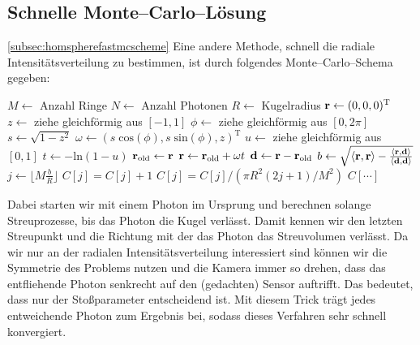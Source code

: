 	\subsection{Schnelle Monte--Carlo--Lösung}\ref{subsec:homspherefastmcscheme}
	Eine andere Methode, schnell die radiale Intensitätsverteilung zu bestimmen, ist durch folgendes Monte--Carlo--Schema gegeben:
	\begin{algorithmic}
		\STATE $M\leftarrow$ Anzahl Ringe
		\STATE $N\leftarrow$ Anzahl Photonen
		\STATE $R\leftarrow$ Kugelradius
			\STATE $\mathbf{r}\leftarrow (0,0,0)^\text{T}$
			\REPEAT
				\STATE{}
				\STATE $z\leftarrow$ ziehe gleichförmig aus $[-1,1]$
				\STATE $\phi\leftarrow$ ziehe gleichförmig aus $[0,2\pi]$
				\STATE $s\leftarrow\sqrt{1-z^2}$
				\STATE $\omega\leftarrow (s\;\text{cos}(\phi),s\;\text{sin}(\phi),z)^\text{T}$
				\STATE{}
				\STATE $u\leftarrow$ ziehe gleichförmig aus $[0,1]$
				\STATE $t\leftarrow -\text{ln}(1-u)$
				\STATE $\mathbf{r}_\text{old}\leftarrow\mathbf{r}$
				\STATE $\mathbf{r}\leftarrow\mathbf{r}_\text{old}+\omega t$
			\STATE{}
			\STATE $\mathbf{d}\leftarrow\mathbf{r}-\mathbf{r}_\text{old}$
			\STATE $b\leftarrow\sqrt{\langle\mathbf{r},\mathbf{r}\rangle-\frac{\langle\mathbf{r},\mathbf{d}\rangle}{\langle\mathbf{d},\mathbf{d}\rangle}}$
			\STATE $j\leftarrow\lfloor M\frac{b}{R}\rfloor$
			\STATE $C[j]=C[j]+1$
		\ENDFOR
			\STATE $C[j]=C[j]/(\pi R^2(2j+1)/M^2)$
		\ENDFOR
		\RETURN $C[\cdots]$
	\end{algorithmic}
	Dabei starten wir mit einem Photon im Ursprung und berechnen solange Streuprozesse, bis das Photon die Kugel verlässt. Damit kennen wir den letzten Streupunkt und die Richtung mit der das Photon das Streuvolumen verlässt. Da wir nur an der radialen Intensitätsverteilung interessiert sind können wir die Symmetrie des Problems nutzen und die Kamera immer so drehen, dass das entfliehende Photon senkrecht auf den (gedachten) Sensor auftrifft. Das bedeutet, dass nur der Stoßparameter entscheidend ist. Mit diesem Trick trägt jedes entweichende Photon zum Ergebnis bei, sodass dieses Verfahren sehr schnell konvergiert.
	
	
